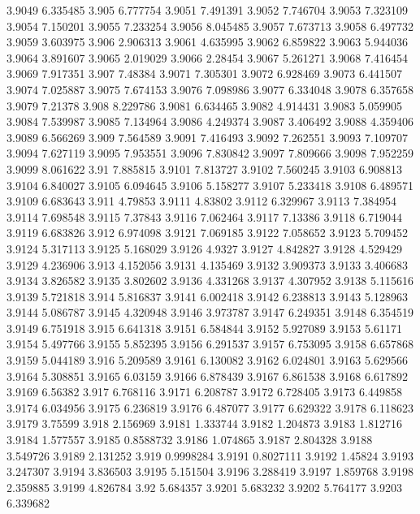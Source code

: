 3.9049  6.335485
3.905  6.777754
3.9051  7.491391
3.9052  7.746704
3.9053  7.323109
3.9054  7.150201
3.9055  7.233254
3.9056  8.045485
3.9057  7.673713
3.9058  6.497732
3.9059  3.603975
3.906  2.906313
3.9061  4.635995
3.9062  6.859822
3.9063  5.944036
3.9064  3.891607
3.9065  2.019029
3.9066  2.28454
3.9067  5.261271
3.9068  7.416454
3.9069  7.917351
3.907  7.48384
3.9071  7.305301
3.9072  6.928469
3.9073  6.441507
3.9074  7.025887
3.9075  7.674153
3.9076  7.098986
3.9077  6.334048
3.9078  6.357658
3.9079  7.21378
3.908  8.229786
3.9081  6.634465
3.9082  4.914431
3.9083  5.059905
3.9084  7.539987
3.9085  7.134964
3.9086  4.249374
3.9087  3.406492
3.9088  4.359406
3.9089  6.566269
3.909  7.564589
3.9091  7.416493
3.9092  7.262551
3.9093  7.109707
3.9094  7.627119
3.9095  7.953551
3.9096  7.830842
3.9097  7.809666
3.9098  7.952259
3.9099  8.061622
3.91  7.885815
3.9101  7.813727
3.9102  7.560245
3.9103  6.908813
3.9104  6.840027
3.9105  6.094645
3.9106  5.158277
3.9107  5.233418
3.9108  6.489571
3.9109  6.683643
3.911  4.79853
3.9111  4.83802
3.9112  6.329967
3.9113  7.384954
3.9114  7.698548
3.9115  7.37843
3.9116  7.062464
3.9117  7.13386
3.9118  6.719044
3.9119  6.683826
3.912  6.974098
3.9121  7.069185
3.9122  7.058652
3.9123  5.709452
3.9124  5.317113
3.9125  5.168029
3.9126  4.9327
3.9127  4.842827
3.9128  4.529429
3.9129  4.236906
3.913  4.152056
3.9131  4.135469
3.9132  3.909373
3.9133  3.406683
3.9134  3.826582
3.9135  3.802602
3.9136  4.331268
3.9137  4.307952
3.9138  5.115616
3.9139  5.721818
3.914  5.816837
3.9141  6.002418
3.9142  6.238813
3.9143  5.128963
3.9144  5.086787
3.9145  4.320948
3.9146  3.973787
3.9147  6.249351
3.9148  6.354519
3.9149  6.751918
3.915  6.641318
3.9151  6.584844
3.9152  5.927089
3.9153  5.61171
3.9154  5.497766
3.9155  5.852395
3.9156  6.291537
3.9157  6.753095
3.9158  6.657868
3.9159  5.044189
3.916  5.209589
3.9161  6.130082
3.9162  6.024801
3.9163  5.629566
3.9164  5.308851
3.9165  6.03159
3.9166  6.878439
3.9167  6.861538
3.9168  6.617892
3.9169  6.56382
3.917  6.768116
3.9171  6.208787
3.9172  6.728405
3.9173  6.449858
3.9174  6.034956
3.9175  6.236819
3.9176  6.487077
3.9177  6.629322
3.9178  6.118623
3.9179  3.75599
3.918  2.156969
3.9181  1.333744
3.9182  1.204873
3.9183  1.812716
3.9184  1.577557
3.9185  0.8588732
3.9186  1.074865
3.9187  2.804328
3.9188  3.549726
3.9189  2.131252
3.919  0.9998284
3.9191  0.8027111
3.9192  1.45824
3.9193  3.247307
3.9194  3.836503
3.9195  5.151504
3.9196  3.288419
3.9197  1.859768
3.9198  2.359885
3.9199  4.826784
3.92  5.684357
3.9201  5.683232
3.9202  5.764177
3.9203  6.339682
